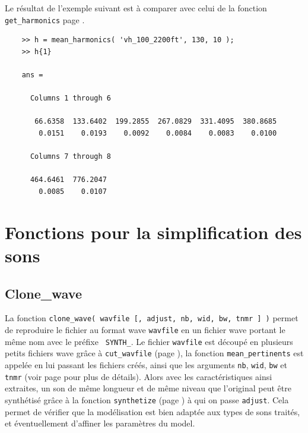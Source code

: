     \newpage
    Le r{\'e}sultat de l'exemple suivant est {\`a} comparer avec celui de
    la fonction {\tt get\_harmonics} page
    \pageref{exgetharmonics}.

    \begin{verbatim}
    >> h = mean_harmonics( 'vh_100_2200ft', 130, 10 );
    >> h{1}

    ans =

      Columns 1 through 6

       66.6358  133.6402  199.2855  267.0829  331.4095  380.8685
        0.0151    0.0193    0.0092    0.0084    0.0083    0.0100

      Columns 7 through 8

      464.6461  776.2047
        0.0085    0.0107
   \end{verbatim}



\newpage
\section{Fonctions pour la simplification des sons}
\label{secsimplification}

    \bigskip
    \subsection{Clone\_wave}
    \label{clonewave}
    La fonction {\tt clone\_wave( wavfile [, adjust,  nb, wid, bw, tnmr ] )}
    permet de reproduire le fichier au format wave {\tt wavfile}
    en un fichier wave portant le m{\^e}me nom avec le pr{\'e}fixe {\tt
    SYNTH\_}. Le fichier {\tt wavfile} est d{\'e}coup{\'e} en plusieurs
    petits fichiers wave gr{\^a}ce {\`a} {\tt cut\_wavfile} (page
    \pageref{cutwavfile}), la fonction {\tt mean\_pertinents}
    est appel{\'e}e en lui passant les fichiers cr{\'e}{\'e}s, ainsi
    que les arguments {\tt nb}, {\tt wid}, {\tt bw} et {\tt tnmr}
    (voir page \pageref{meanpertinents} pour plus de d{\'e}tails).
    Alors avec les caract{\'e}ristiques ainsi extraites, un son de m{\^e}me
    longueur et de m{\^e}me niveau que l'original peut {\^e}tre synth{\'e}tis{\'e}
    gr{\^a}ce {\`a} la fonction {\tt synthetize} (page
    \pageref{synthetize}) {\`a} qui on passe {\tt adjust}. Cela permet de v{\'e}rifier que la
    mod{\'e}lisation est bien adapt{\'e}e aux types de sons trait{\'e}s, et
    {\'e}ventuellement d'affiner les param{\`e}tres du model.\\

